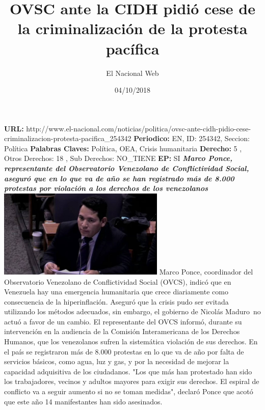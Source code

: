\documentclass{article}%
\title{\textbf{OVSC ante la CIDH pidió cese de la criminalización de la protesta pacífica}}%
\author{El Nacional Web}%
\date{04/10/2018}%
\begin{document}
%
\normalsize%
\maketitle%
\textbf{URL: }%
http://www.el{-}nacional.com/noticias/politica/ovsc{-}ante{-}cidh{-}pidio{-}cese{-}criminalizacion{-}protesta{-}pacifica\_254342\newline%
%
\textbf{Periodico: }%
EN, %
ID: %
254342, %
Seccion: %
Política\newline%
%
\textbf{Palabras Claves: }%
Política, OEA, Crisis humanitaria\newline%
%
\textbf{Derecho: }%
5%
, Otros Derechos: %
18%
, Sub Derechos: %
NO\_TIENE%
\newline%
%
\textbf{EP: }%
SI\newline%
\newline%
%
\textbf{\textit{Marco Ponce, representante del Observatorio Venezolano de Conflictividad Social, aseguró que en lo que va de año se han registrado más de 8.000 protestas por violación a los derechos de los venezolanos}}%
\newline%
\newline%
%
\includegraphics[width=300px]{90.jpg}%
\newline%
%
Marco Ponce, coordinador del Observatorio Venezolano de Conflictividad Social (OVCS), indicó que en Venezuela hay una emergencia humanitaria que crece diariamente como consecuencia de la hiperinflación. Aseguró que la crisis pudo ser evitada utilizando los métodos adecuados, sin embargo, el gobierno de Nicolás Maduro~no actuó a favor de un cambio.%
\newline%
%
El representante del OVCS informó, durante su intervención en la audiencia de la Comisión Interamericana de los Derechos Humanos, que los venezolanos sufren la sistemática violación de sus derechos. En el país se registraron más de 8.000 protestas en lo que va de año por falta de servicios básicos, como agua, luz y gas, y por la necesidad de mejorar la capacidad adquisitiva de los ciudadanos.%
\newline%
%
"Los que más han protestado han sido los trabajadores, vecinos y adultos mayores para exigir sus derechos. El espiral de conflicto va a seguir aumento si no se toman medidas", declaró Ponce que acotó que este año 14 manifestantes han sido asesinados.%
\end{document}
